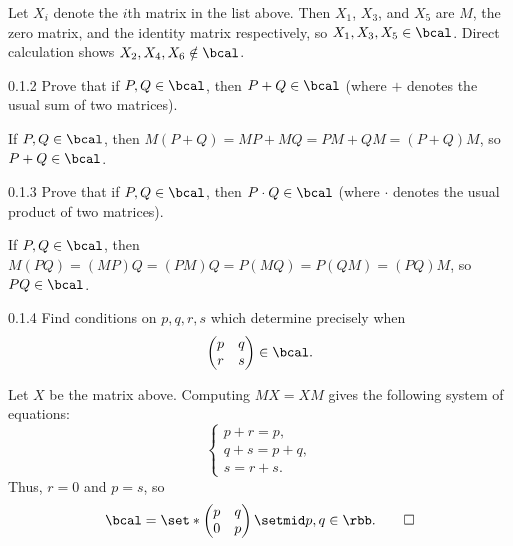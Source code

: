 \begin{sol}
    Let $X_i$ denote the $i$th matrix in the list above.
	Then $X_1$, $X_3$, and $X_5$ are $M$, the zero matrix, and the identity matrix respectively, so $X_1, X_3, X_5 \in \bcal$.
	Direct calculation shows $X_2, X_4, X_6 \notin \bcal$.
\end{sol}

\begin{exercise}{0.1.2}
    Prove that if $P, Q \in \bcal$, then $P + Q \in \bcal$ (where $+$ denotes the usual sum of two matrices).
\end{exercise}

\begin{sol}
    If $P, Q \in \bcal$, then $M(P + Q) = MP + MQ = PM + QM = (P + Q)M$, so $P + Q \in \bcal$.
\end{sol}

\begin{exercise}{0.1.3}
    Prove that if $P, Q \in \bcal$, then $P\cdot Q \in \bcal$ (where $\cdot$ denotes the usual product of two matrices).
\end{exercise}

\begin{sol}
    If $P, Q \in \bcal$, then $M(PQ) = (MP)Q = (PM)Q = P(MQ) = P(QM) = (PQ)M$, so $PQ \in \bcal$.
\end{sol}

\begin{exercise}{0.1.4}
    Find conditions on $p, q, r, s$ which determine precisely when
    \[
        \begin{pmatrix}
            p & q \\
            r & s
        \end{pmatrix} \in \bcal.
    \]
\end{exercise}

\begin{sol}
    Let $X$ be the matrix above.
	Computing $MX = XM$ gives the following system of equations:
    \[
        \begin{cases}
            p + r = p, \\
            q + s = p + q, \\
            s = r + s.
        \end{cases}
    \]
    Thus, $r = 0$ and $p = s$, so
    \[
        \bcal = 
        \set*{
            \begin{pmatrix}
                p & q \\
                0 & p
            \end{pmatrix}
        \setmid p, q \in \rbb}. \qedhere
    \]
\end{sol}

